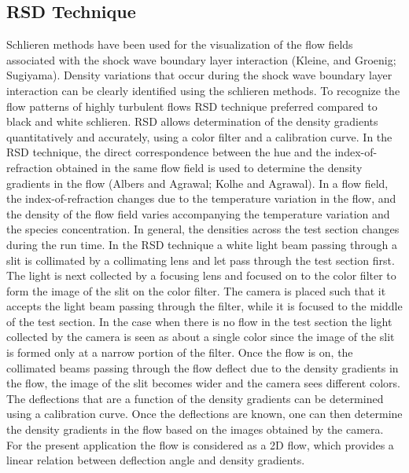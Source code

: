 \documentclass{article}
\begin{document}
\subsection{RSD Technique}
Schlieren methods have been used for the visualization of the flow fields associated with the shock wave boundary layer interaction (Kleine, and Groenig; Sugiyama). Density variations that occur during the shock wave boundary layer interaction can be clearly identified using the schlieren methods. To recognize the flow patterns of highly turbulent flows RSD technique preferred compared to black and white schlieren. RSD allows determination of the density gradients quantitatively and accurately, using a color filter and a calibration curve. In the RSD technique, the direct correspondence between the hue and the index-of-refraction obtained in the same flow field is used to determine the density gradients in the flow (Albers and Agrawal; Kolhe and Agrawal). In a flow field, the index-of-refraction changes due to the temperature variation in the flow, and the density of the flow field varies accompanying the temperature variation and the species concentration. In general, the densities across the test section changes during the run time. 
	In the RSD technique a white light beam passing through a slit is collimated by a collimating lens and let pass through the test section first. The light is next collected by a focusing lens and focused on to the color filter to form the image of the slit on the color filter. The camera is placed such that it accepts the light beam passing through the filter, while it is focused to the middle of the test section. In the case when there is no flow in the test section the light collected by the camera is seen as about a single color since the image of the slit is formed only at a narrow portion of the filter. Once the flow is on, the collimated beams passing through the flow deflect due to the density gradients in the flow, the image of the slit becomes wider and the camera sees different colors. The deflections that are a function of the density gradients can be determined using a calibration curve. Once the deflections are known, one can then determine the density gradients in the flow based on the images obtained by the camera. For the present application the flow is considered as a 2D flow, which provides a linear relation between deflection angle and density gradients.
\end{document}
